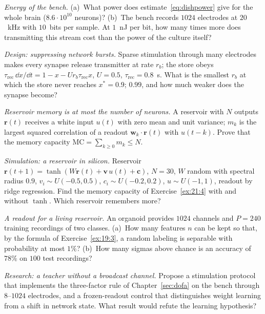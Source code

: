 \begin{exercise}[\lvlA]
\label{ex:21:2}
\emph{Energy of the bench.} (a)~What power does estimate~\eqref{eq:dishpower} give for the whole brain ($8.6\cdot10^{10}$ neurons)? (b)~The bench records $1024$ electrodes at $20$~kHz with $10$~bits per sample. At $1$~nJ per bit, how many times more does transmitting this stream cost than the power of the culture itself?
\end{exercise}

\begin{exercise}[\lvlB]
\label{ex:21:3}
\emph{Design: suppressing network bursts.} Sparse stimulation through many electrodes makes every synapse release transmitter at rate $r_b$; the store obeys $\tau_{\text{rec}}\,\dd x/\dd t=1-x-Ur_b\tau_{\text{rec}}x$, $U=0.5$, $\tau_{\text{rec}}=0.8$~s. What is the smallest $r_b$ at which the store never reaches $x^*=0.9$; $0.99$, and how much weaker does the synapse become?
\end{exercise}

\begin{exercise}[\lvlB]
\label{ex:21:4}
\emph{Reservoir memory is at most the number of neurons.} A reservoir with $N$ outputs $\mathbf r(t)$ receives a white input $u(t)$ with zero mean and unit variance; $m_k$ is the largest squared correlation of a readout $\mathbf w_k\cdot\mathbf r(t)$ with $u(t-k)$. Prove that the memory capacity $\mathrm{MC}=\sum_{k\ge0}m_k\le N$.
\end{exercise}

\begin{exercise}[\lvlB]
\label{ex:21:5}
\emph{Simulation: a reservoir in silicon.} Reservoir $\mathbf r(t+1)=\tanh(W\mathbf r(t)+\mathbf v\,u(t)+\mathbf c)$, $N=30$, $W$ random with spectral radius $0.9$, $v_i\sim U(-0.5,0.5)$, $c_i\sim U(-0.2,0.2)$, $u\sim U(-1,1)$, readout by ridge regression. Find the memory capacity of Exercise~\ref{ex:21:4} with and without $\tanh$. Which reservoir remembers more?
\end{exercise}

\begin{exercise}[\lvlB]
\label{ex:21:6}
\emph{A readout for a living reservoir.} An organoid provides $1024$ channels and $P=240$ training recordings of two classes. (a)~How many features $n$ can be kept so that, by the formula of Exercise~\ref{ex:19:3}, a random labeling is separable with probability at most $1\%$? (b)~How many sigmas above chance is an accuracy of $78\%$ on $100$ test recordings?
\end{exercise}

\begin{exercise}[\lvlC]
\label{ex:21:7}
\emph{Research: a teacher without a broadcast channel.} Propose a stimulation protocol that implements the three-factor rule of Chapter~\ref{sec:dofa} on the bench through $8$--$1024$ electrodes, and a frozen-readout control that distinguishes weight learning from a shift in network state. What result would refute the learning hypothesis?
\end{exercise}
